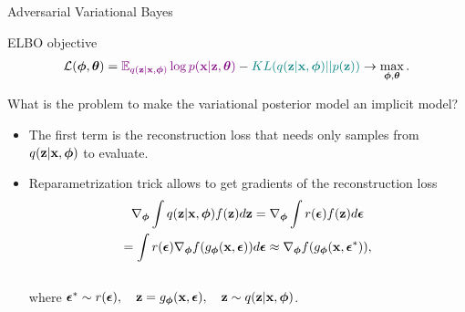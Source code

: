 \documentclass{beamer}
\begin{document}
\begin{frame}{Adversarial Variational Bayes}
	\begin{block}{ELBO objective}
		\vspace{-0.6cm}
		\[
			 \mathcal{L} (\boldsymbol{\phi}, \boldsymbol{\theta})  = {\color{violet}\mathbb{E}_{q(\mathbf{z} | \mathbf{x}, \boldsymbol{\phi})} \log p(\mathbf{x} | \mathbf{z}, \boldsymbol{\theta})} - {\color{teal}KL(q(\mathbf{z}| \mathbf{x}, \boldsymbol{\phi}) || p(\mathbf{z}))} \rightarrow \max_{\boldsymbol{\phi}, \boldsymbol{\theta}}.
		\]	
		\vspace{-0.6cm}
	\end{block}
	What is the problem to make the variational posterior model an implicit model?
	\begin{itemize}
	\item {\color{violet}The first term} is the reconstruction loss that needs only samples from $q(\mathbf{z} | \mathbf{x}, \boldsymbol{\phi})$ to evaluate.
	\item Reparametrization trick allows to get gradients of the reconstruction loss
		\vspace{-0.4cm}
		\begin{multline*}
			\nabla_{\boldsymbol{\phi}}\int q(\mathbf{z}|\mathbf{x}, \boldsymbol{\phi}) f(\mathbf{z}) d\mathbf{z} = \nabla_{\boldsymbol{\phi}}\int r(\boldsymbol{\epsilon})  f(\mathbf{z}) d\boldsymbol{\epsilon} \\ = \int r(\boldsymbol{\epsilon}) \nabla_{\boldsymbol{\phi}} f(g_{\boldsymbol{\phi}}(\mathbf{x}, \boldsymbol{\epsilon})) d\boldsymbol{\epsilon} \approx \nabla_{\boldsymbol{\phi}} f(g_{\boldsymbol{\phi}}(\mathbf{x}, \boldsymbol{\epsilon}^*)),
		\end{multline*}
		\vspace{-0.6cm} \\
		where $\boldsymbol{\epsilon}^* \sim r(\boldsymbol{\epsilon}), \quad \mathbf{z} = g_{\boldsymbol{\phi}}(\mathbf{x}, \boldsymbol{\epsilon}), \quad \mathbf{z} \sim q(\mathbf{z} | \mathbf{x}, \boldsymbol{\phi})$.
	\end{itemize}
\end{frame}
\end{document}
